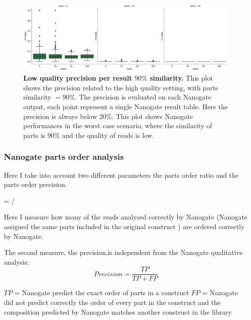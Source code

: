 \documentclass[11pt, a4paper]{article}
\begin{document}
\begin{figure}[ht]
    \begin{center}
    \includegraphics[width=1.35\textwidth]{../results/images_notebook/v_500/lq_sim_90_precision_per_result.pdf}
    \end{center}
    \caption{{\bf Low quality precision per result $90\%$ similarity.} This plot shows the precision related to the high quality setting, with parts similarity $=90\%$. The precision is evaluated on each  Nanogate output, each point represent a single Nanogate result table. Here the precision is always below $20\%$. This plot shows Nanogate performances in the worst case scenario, where the similarity of parts is $90\%$ and the quality of reads is low.}
   \label{fig:v_500_lq_sim_90_precision_per_result}
\end{figure}

\clearpage
\subsubsection{Nanogate parts order analysis }
Here I take into account two different parameters the parts order ratio and the parts order precision.

 =  / 

Here I measure how many of the reads analysed correctly by Nanogate (Nanogate assigned the same parts included in the original construct ) are ordered correctly by Nanogate.

The second measure, the precision,is independent from the Nanogate qualitative analysis:
\begin{equation}
    Precision = \frac{TP}{TP + FP}
\end{equation}

$TP$ = Nanogate predict the exact order of parts in a construct
$FP$ = Nanogate did not predict correctly the order of every part in the construct and the composition predicted by Nanogate matches another construct in the library
\end{document}
